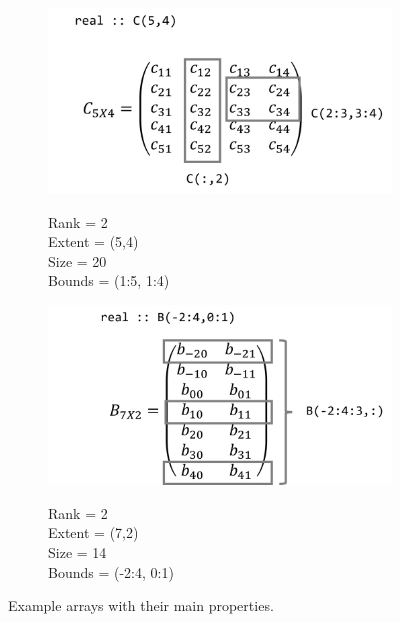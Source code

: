 \newpage
\FloatBarrier
\begin{figure}
    \begin{subfigure}[b]{0.5\textwidth}
        \centering
        \includegraphics[width = \textwidth]{./doc/Figures/Array1.png}  \\
        \begin{center}
            Rank = 2 \\
            Extent = (5,4) \\
            Size = 20 \\
            Bounds = (1:5, 1:4) \\
        \end{center}
    \end{subfigure}
    \hspace{\fill}
    \begin{subfigure}[b]{0.5\textwidth}
        \centering
        \includegraphics[width = \textwidth]{./doc/Figures/Array3.png}  \\
        \begin{center}
            Rank = 2 \\
            Extent = (7,2) \\
            Size = 14 \\
            Bounds = (-2:4, 0:1) \\
        \end{center}
    \end{subfigure}
    \caption{Example arrays with their main properties.}   \label{fig:arrays}
\end{figure}

